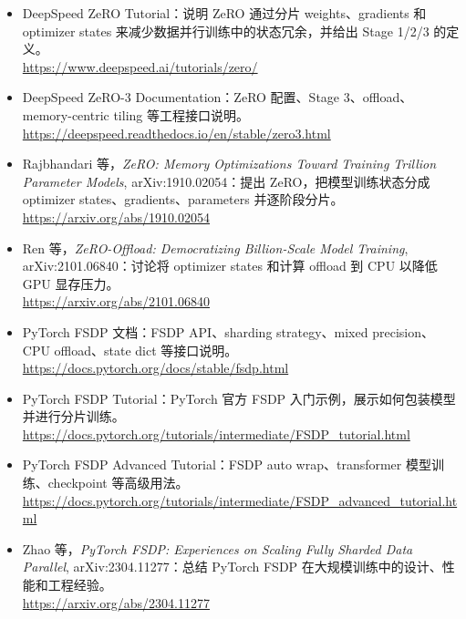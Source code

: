 \begingroup
\small
\sloppy
\begin{itemize}[leftmargin=1.5em]
  \item DeepSpeed ZeRO Tutorial：说明 ZeRO 通过分片 weights、gradients 和 optimizer states 来减少数据并行训练中的状态冗余，并给出 Stage 1/2/3 的定义。\\
  \url{https://www.deepspeed.ai/tutorials/zero/}
  \item DeepSpeed ZeRO-3 Documentation：ZeRO 配置、Stage 3、offload、memory-centric tiling 等工程接口说明。\\
  \url{https://deepspeed.readthedocs.io/en/stable/zero3.html}
  \item Rajbhandari 等，\emph{ZeRO: Memory Optimizations Toward Training Trillion Parameter Models}, arXiv:1910.02054：提出 ZeRO，把模型训练状态分成 optimizer states、gradients、parameters 并逐阶段分片。\\
  \url{https://arxiv.org/abs/1910.02054}
  \item Ren 等，\emph{ZeRO-Offload: Democratizing Billion-Scale Model Training}, arXiv:2101.06840：讨论将 optimizer states 和计算 offload 到 CPU 以降低 GPU 显存压力。\\
  \url{https://arxiv.org/abs/2101.06840}
  \item PyTorch FSDP 文档：FSDP API、sharding strategy、mixed precision、CPU offload、state dict 等接口说明。\\
  \url{https://docs.pytorch.org/docs/stable/fsdp.html}
  \item PyTorch FSDP Tutorial：PyTorch 官方 FSDP 入门示例，展示如何包装模型并进行分片训练。\\
  \url{https://docs.pytorch.org/tutorials/intermediate/FSDP_tutorial.html}
  \item PyTorch FSDP Advanced Tutorial：FSDP auto wrap、transformer 模型训练、checkpoint 等高级用法。\\
  \url{https://docs.pytorch.org/tutorials/intermediate/FSDP_advanced_tutorial.html}
  \item Zhao 等，\emph{PyTorch FSDP: Experiences on Scaling Fully Sharded Data Parallel}, arXiv:2304.11277：总结 PyTorch FSDP 在大规模训练中的设计、性能和工程经验。\\
  \url{https://arxiv.org/abs/2304.11277}
\end{itemize}
\endgroup
